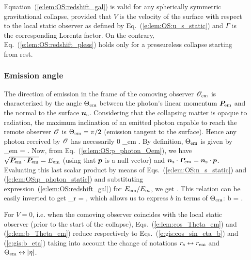 \begin{remark}
Equation~(\ref{e:lem:OS:redshift_gal}) is valid for any spherically symmetric
gravitational collapse, provided that $V$ is the velocity of the surface
with respect to the local static observer as defined by Eq.~(\ref{e:lem:OS:u_s_static})
and $\Gamma$ is the corresponding Lorentz factor. On the contrary,
Eq.~(\ref{e:lem:OS:redshift_pless}) holds only for a pressureless collapse
starting from rest.
\end{remark}

\subsubsection{Emission angle}

The direction of emission in the frame of the comoving observer $\mathscr{O}_{\rm em}$
is characterized by the angle $\Theta_{\rm em}$ between the photon's linear momentum $\bm{P}_{\rm em}$
and the normal to the surface $\bm{n}_{\rm s}$. Considering that the collapsing matter
is opaque to radiation, the maximum inclination of an emitted photon capable to
reach the remote observer $\mathscr{O}$ is
$\Theta_{\rm em} = \pi/2$ (emission tangent to the surface).
Hence any photon received by $\mathscr{O}$ has necessarily
\be \label{e:lem:em_angle}
        0 \leq \Theta_{\rm em} \leq {} .
\ee
By definition, $\Theta_{\rm em}$ is given by
\be
    \cos\Theta_{\rm em} =
     .
\ee
Now, from Eq.~(\ref{e:lem:OS:p_photon_Oem}), we have
$\sqrt{\bm{P}_{\rm em}\cdot\bm{P}_{\rm em}} = E_{\rm em}$ (using that $\bm{p}$ is a null vector)
and $\bm{n}_{\rm s}\cdot\bm{P}_{\rm em} = \bm{n}_{\rm s}\cdot\bm{p}$. Evaluating this
last scalar product by means of Eqs.~(\ref{e:lem:OS:n_s_static}) and
(\ref{e:lem:OS:p_photon_static}) and substituting expression~(\ref{e:lem:OS:redshift_gal}) for
${E_{\rm em}}/{E_\infty}$, we get
\be \label{e:lem:cos_Theta_em}
    .
\ee
This relation can be easily inverted to get
\be \label{e:lem:sqrt_b2_cos_Th}
    \epsilon_r  =  ,
\ee
which allows us to express $b$ in terms of $\Theta_{\rm em}$:
\be \label{e:lem:b_Theta_em}
    b =  .
\ee
\begin{remark}
For $V=0$, i.e. when the comoving observer coincides with the local static observer (prior to the
start of the collapse), Eqs.~(\ref{e:lem:cos_Theta_em}) and (\ref{e:lem:b_Theta_em})
reduce respectively to Eqs.~(\ref{e:gis:cos_sin_eta_b}) and (\ref{e:gis:b_eta})
taking into account the change of notations $r_{\rm s}\leftrightarrow r_{\rm em}$ and
$\Theta_{\rm em} \leftrightarrow |\eta|$.
\end{remark}
